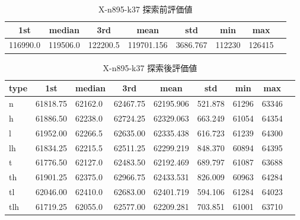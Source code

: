 \begin{table}[htbp]
    \centering
    \caption{X-n895-k37 探索前評価値}
    \begin{tabular}{|l|l|l|l|l|l|l|l|}\hline
    \multicolumn{1}{|c|}{\textbf{1st}}
    &\multicolumn{1}{c|}{\textbf{median}}
    &\multicolumn{1}{c|}{\textbf{3rd}}
    &\multicolumn{1}{c|}{\textbf{mean}}
    &\multicolumn{1}{c|}{\textbf{std}}
    &\multicolumn{1}{c|}{\textbf{min}}
    &\multicolumn{1}{c|}{\textbf{max}}\\\hline
	116990.0 & 119506.0 & 122200.5 & 119701.156 & 3686.767 & 112230 & 126415\\\hline
	\end{tabular}
\end{table}
\begin{table}[htbp]
    \centering
    \caption{X-n895-k37 探索後評価値}
    \begin{tabular}{|l|l|l|l|l|l|l|l|l|}\hline
    \multicolumn{1}{|c|}{\textbf{type}}
    &\multicolumn{1}{|c|}{\textbf{1st}}
    &\multicolumn{1}{c|}{\textbf{median}}
    &\multicolumn{1}{c|}{\textbf{3rd}}
    &\multicolumn{1}{c|}{\textbf{mean}}
    &\multicolumn{1}{c|}{\textbf{std}}
    &\multicolumn{1}{c|}{\textbf{min}}
    &\multicolumn{1}{c|}{\textbf{max}}\\\hline
	n & 61818.75 & 62162.0 & 62467.75 & 62195.906 & 521.878 & 61296 & 63346\\\hline
	h & 61886.50 & 62238.0 & 62724.25 & 62329.063 & 663.249 & 61054 & 64354\\\hline
	l & 61952.00 & 62266.5 & 62635.00 & 62335.438 & 616.723 & 61239 & 64300\\\hline
	lh & 61834.25 & 62215.5 & 62511.25 & 62299.219 & 848.370 & 60894 & 64395\\\hline
	t & 61776.50 & 62127.0 & 62483.50 & 62192.469 & 689.797 & 61087 & 63688\\\hline
	th & 61901.25 & 62375.0 & 62966.75 & 62433.531 & 826.009 & 60963 & 64284\\\hline
	tl & 62046.00 & 62410.0 & 62683.00 & 62401.719 & 594.106 & 61284 & 64023\\\hline
	tlh & 61719.25 & 62055.0 & 62577.00 & 62209.281 & 703.851 & 61001 & 63710\\\hline
	\end{tabular}
\end{table}
